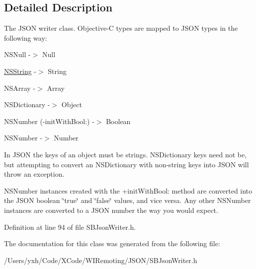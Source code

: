 \subsection{Detailed Description}
The JSON writer class. Objective-\/C types are mapped to JSON types in the following way:

\begin{DoxyItemize}
\item NSNull -\/$>$ Null \item \hyperlink{class_n_s_string}{NSString} -\/$>$ String \item NSArray -\/$>$ Array \item NSDictionary -\/$>$ Object \item NSNumber (-\/initWithBool:) -\/$>$ Boolean \item NSNumber -\/$>$ Number\end{DoxyItemize}
In JSON the keys of an object must be strings. NSDictionary keys need not be, but attempting to convert an NSDictionary with non-\/string keys into JSON will throw an exception.

NSNumber instances created with the +initWithBool: method are converted into the JSON boolean \char`\"{}true\char`\"{} and \char`\"{}false\char`\"{} values, and vice versa. Any other NSNumber instances are converted to a JSON number the way you would expect. 

Definition at line 94 of file SBJsonWriter.h.

The documentation for this class was generated from the following file:\begin{DoxyCompactItemize}
\item 
/Users/yxh/Code/XCode/WIRemoting/JSON/SBJsonWriter.h\end{DoxyCompactItemize}

